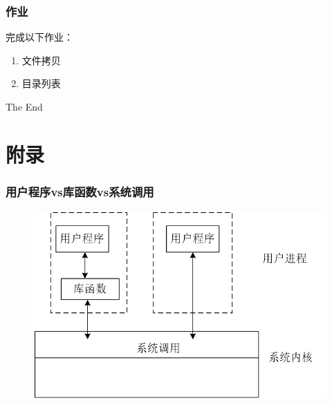 \documentclass{beamer}
\begin{document}
\begin{frame}
\frametitle{作业}
完成以下作业：
\begin{enumerate}
\item
文件拷贝
\item
目录列表
\end{enumerate}
\end{frame}



\begin{frame}
\Huge{\centerline{The End}}
\end{frame}



\section{附录}
\begin{frame}

\frametitle{用户程序vs库函数vs系统调用}

\begin{figure}
\includegraphics[width=1\linewidth]{601}
\end{figure}
\end{frame}
\end{document}
